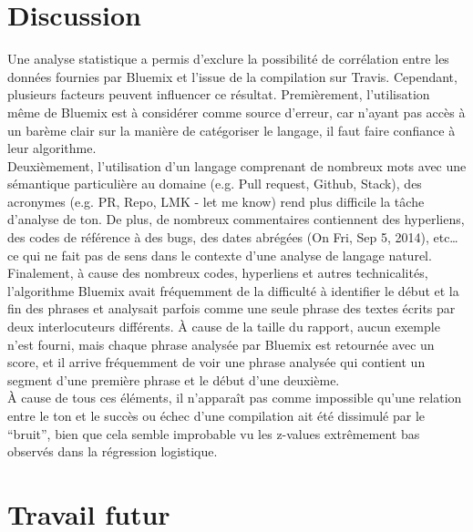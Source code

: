 \documentclass[10pt, conference]{IEEEtran}
\begin{document}
\section{Discussion}
\label{sec:discussion}

Une analyse statistique a permis d’exclure la possibilité de corrélation entre les données fournies par Bluemix et l'issue de la compilation sur Travis. Cependant, plusieurs facteurs peuvent influencer ce résultat.
Premièrement, l’utilisation même de Bluemix est à considérer comme source d’erreur, car n’ayant pas accès à un barème clair sur la manière de catégoriser le langage, il faut faire confiance à leur algorithme. \\
Deuxièmement, l’utilisation d’un langage comprenant de nombreux mots avec une sémantique particulière au domaine (e.g. Pull request, Github, Stack), des acronymes (e.g. PR, Repo, LMK - let me know) rend plus difficile la tâche d’analyse de ton. De plus, de nombreux commentaires contiennent des hyperliens, des codes de référence à des bugs, des dates abrégées (On Fri, Sep 5, 2014), etc… ce qui ne fait pas de sens dans le contexte d’une analyse de langage naturel. \\
Finalement, à cause des nombreux codes, hyperliens et autres technicalités, l’algorithme Bluemix avait fréquemment de la difficulté à identifier le début et la fin des phrases et analysait parfois comme une seule phrase des textes écrits par deux interlocuteurs différents. À cause de la taille du rapport, aucun exemple n’est fourni, mais chaque phrase analysée par Bluemix est retournée avec un score, et il arrive fréquemment de voir une phrase analysée qui contient un segment d’une première phrase et le début d’une deuxième. \\
À cause de tous ces éléments, il n'apparaît pas comme impossible qu’une relation entre le ton et le succès ou échec d’une compilation ait été dissimulé par le “bruit”, bien que cela semble improbable vu les z-values extrêmement bas observés dans la régression logistique. \\

\section{Travail futur}
\label{sec:future}
\end{document}
